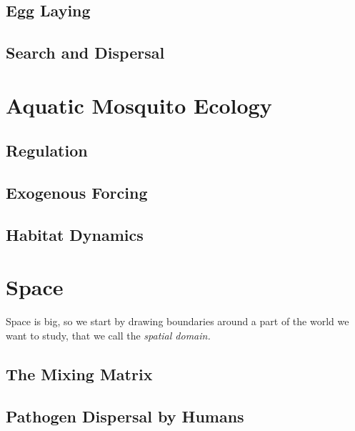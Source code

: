 \documentclass[
]{book}
\begin{document}
\hypertarget{egg-laying}{%
\subsection{Egg Laying}\label{egg-laying}}

\hypertarget{search-and-dispersal}{%
\subsection{Search and Dispersal}\label{search-and-dispersal}}

\hypertarget{aquatic-mosquito-ecology}{%
\section{Aquatic Mosquito Ecology}\label{aquatic-mosquito-ecology}}

\hypertarget{regulation}{%
\subsection{Regulation}\label{regulation}}

\hypertarget{exogenous-forcing}{%
\subsection{Exogenous Forcing}\label{exogenous-forcing}}

\hypertarget{habitat-dynamics}{%
\subsection{Habitat Dynamics}\label{habitat-dynamics}}

\hypertarget{space}{%
\section{Space}\label{space}}

Space is big, so we start by drawing boundaries around a part of the world we want to study, that we call the \emph{spatial domain.}

\hypertarget{the-mixing-matrix}{%
\subsection{The Mixing Matrix}\label{the-mixing-matrix}}

\hypertarget{pathogen-dispersal-by-humans}{%
\subsection{Pathogen Dispersal by Humans}\label{pathogen-dispersal-by-humans}}
\end{document}
